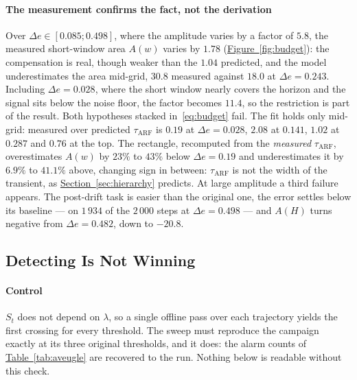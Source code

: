 \documentclass[10pt,conference]{IEEEtran}
\theoremstyle{definition}
\begin{document}
\paragraph{The measurement confirms the fact, not the derivation} Over
$\Delta e \in [0.085;0.498]$, where the amplitude varies by a factor of $5.8$, the measured
short-window area $A(w)$ varies by $1.78$ (\hyperref[fig:budget]{Figure~\ref*{fig:budget}}): the compensation is
real, though weaker than the $1.04$ predicted, and the model underestimates the area
mid-grid, $30.8$ measured against $18.0$ at $\Delta e = 0.243$. Including
$\Delta e = 0.028$, where the short window nearly covers the horizon and the signal sits
below the noise floor, the factor becomes $11.4$, so the restriction is part of the result.
Both hypotheses stacked in~\eqref{eq:budget} fail. The fit holds only mid-grid: measured
over predicted $\tau_{\mathrm{ARF}}$ is $0.19$ at $\Delta e = 0.028$, $2.08$ at $0.141$,
$1.02$ at $0.287$ and $0.76$ at the top. The rectangle, recomputed from the
\emph{measured} $\tau_{\mathrm{ARF}}$, overestimates $A(w)$ by $23\%$ to $43\%$ below
$\Delta e = 0.19$ and underestimates it by $6.9\%$ to $41.1\%$ above, changing sign in
between: $\tau_{\mathrm{ARF}}$ is not the width of the transient, as
\hyperref[sec:hierarchy]{Section~\ref*{sec:hierarchy}} predicts. At large amplitude a third failure appears. The
post-drift task is easier than the original one, the error settles below its baseline ---
on $1\,934$ of the $2\,000$ steps at $\Delta e = 0.498$ --- and $A(H)$ turns negative from
$\Delta e = 0.482$, down to $-20.8$.

\begin{center}
\end{center}

\subsection{Detecting Is Not Winning}

\paragraph{Control} $S_t$ does not depend on $\lambda$, so a single offline pass over
each trajectory yields the first crossing for every threshold. The sweep must reproduce
the campaign exactly at its three original thresholds, and it does: the alarm counts
of \hyperref[tab:aveugle]{Table~\ref*{tab:aveugle}} are recovered to the run. Nothing below is readable without
this check.
\end{document}
